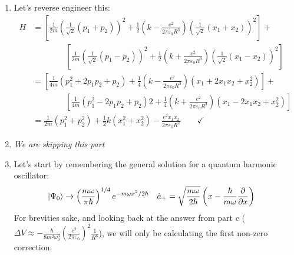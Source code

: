 \documentclass[11pt]{article}
\begin{document}
\begin{enumerate}[label=\alph*)]
\item Let's reverse engineer this:
\begin{align*}
H & = \left[\frac{1}{2m}\left(\frac{1}{\sqrt{2}}(p_1 + p_2)\right)^2 + \frac{1}{2}\left(k - \frac{e^2}{2\pi\varepsilon_0R^3}\right)\left(\frac{1}{\sqrt{2}}(x_1 + x_2)\right)^2\right] + \\
& \qquad \qquad \left[\frac{1}{2m}\left(\frac{1}{\sqrt{2}}(p_1 - p_2)\right)^2 + \frac{1}{2}\left(k + \frac{e^2}{2\pi\varepsilon_0R^3}\right)\left(\frac{1}{\sqrt{2}}(x_1 - x_2)\right)^2\right]\\
& = \left[\frac{1}{4m}\left(p_1^2 + 2p_1p_2 + p_2\right) + \frac{1}{4}\left(k - \frac{e^2}{2\pi\varepsilon_0R^3}\right)\left(x_1 + 2x_1x_2 + x_2^2\right)\right] + \\
& \qquad \qquad \left[\frac{1}{4m}\left(p_1^2 - 2p_1p_2 + p_2\right)2 + \frac{1}{4}\left(k + \frac{e^2}{2\pi\varepsilon_0R^3}\right)\left(x_1 - 2x_1x_2 + x_2^2\right)\right]\\
& = \frac{1}{2m}(p_1^2 +p_2^2) + \frac{1}{2}k(x_1^2 + x_2^2) - \frac{e^2x_1x_2}{2\pi\varepsilon_0 R^2} \qquad \checkmark	
\end{align*}
\item \emph{We are skipping this part}
\item Let's start by remembering the general solution for a quantum harmonic oscillator:
\begin{align*}
\ket{\Psi_0} & \rightarrow \left(\frac{m\omega}{\pi \hbar}\right)^{1/4} e^{-m\omega x^2/2\hbar} & \hat{a}_+ & = \sqrt{\frac{m\omega}{2\hbar}}\left(x -\frac{\hbar}{m\omega}\pdv{x}\right)
\end{align*}
For brevities sake, and looking back at the answer from part c ($\displaystyle \Delta V \approx -\frac{\hbar}{8m^2 \omega_0^3}\left(\frac{e^2}{2\pi\varepsilon_0}\right)^2 \frac{1}{R^6}$), we will only be calculating the first non-zero correction. 


\end{enumerate}
\end{document}
